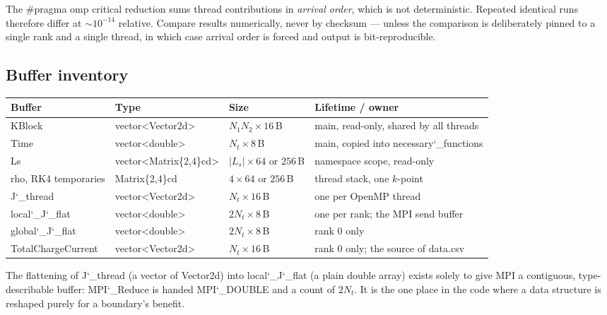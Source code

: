 \documentclass[11pt,a4paper]{article}
\newcommand{\code}[1]{{\ttfamily #1}}
\newcommand{\brk}{\discretionary{}{}{}}
\newcommand{\uu}{\char`_\brk}
\newcommand{\fn}[1]{{\ttfamily #1}}
\begin{document}
\begin{keybox}[title={Reproducibility consequence}]
The \code{\#pragma omp critical} reduction sums thread contributions in
\emph{arrival order}, which is not deterministic. Repeated identical runs
therefore differ at $\sim10^{-14}$ relative. Compare results numerically, never
by checksum --- unless the comparison is deliberately pinned to a single rank
and a single thread, in which case arrival order is forced and output is
bit-reproducible.
\end{keybox}

\subsection{Buffer inventory}

\begin{center}
\scriptsize
\begin{tabular}{@{}L{0.23\textwidth} L{0.24\textwidth} L{0.17\textwidth} L{0.28\textwidth}@{}}
\toprule
\textbf{Buffer} & \textbf{Type} & \textbf{Size} & \textbf{Lifetime / owner} \\
\midrule
\fn{KBlock}            & \fn{vector<Vector2d>} & $N_1N_2 \times 16$\,B & \fn{main}, read-only, shared by all threads \\
\fn{Time}              & \fn{vector<double>}   & $N_t \times 8$\,B     & \fn{main}, copied into \fn{necessary\uu functions} \\
\fn{Ls}                & \fn{vector<Matrix\{2,4\}cd>} & $|L_s| \times 64$ or $256$\,B & namespace scope, read-only \\
\fn{rho}, RK4 temporaries & \fn{Matrix\{2,4\}cd}  & $4 \times 64$ or $256$\,B & thread stack, one $k$-point \\
\fn{J\uu thread}       & \fn{vector<Vector2d>} & $N_t \times 16$\,B    & one per OpenMP thread \\
\fn{local\uu J\uu flat}& \fn{vector<double>}   & $2N_t \times 8$\,B    & one per rank; the MPI send buffer \\
\fn{global\uu J\uu flat}& \fn{vector<double>}  & $2N_t \times 8$\,B    & rank 0 only \\
\fn{TotalChargeCurrent}& \fn{vector<Vector2d>} & $N_t \times 16$\,B    & rank 0 only; the source of \code{data.csv} \\
\bottomrule
\end{tabular}
\end{center}

\noindent The flattening of \fn{J\uu thread} (a vector of \fn{Vector2d}) into
\fn{local\uu J\uu flat} (a plain \fn{double} array) exists solely to give MPI a
contiguous, type-describable buffer: \fn{MPI\uu Reduce} is handed
\fn{MPI\uu DOUBLE} and a count of $2N_t$. It is the one place in the code where
a data structure is reshaped purely for a boundary's benefit.
\end{document}
